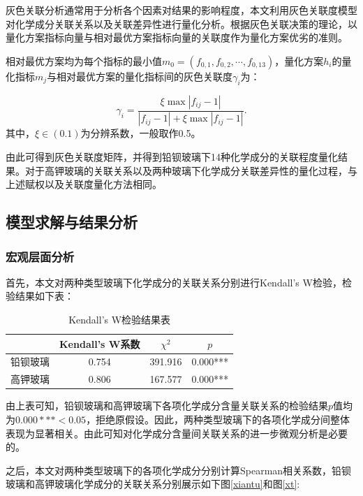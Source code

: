 \documentclass[withoutpreface,bwprint]{cumcmthesis} %
\begin{document}
灰色关联分析通常用于分析各个因素对结果的影响程度，本文利用灰色关联度模型对化学成分关联关系以及关联差异性进行量化分析。根据灰色关联决策的理论，以量化方案指标向量与相对最优方案指标向量的关联度作为量化方案优劣的准则。

相对最优方案均为每个指标的最小值$m_0 = (f_{0,1},f_{0,2},\cdots,f_{0,13})$，量化方案$h_i$的量化指标$m_j$与相对最优方案的量化指标间的灰色关联度$\gamma_i$为：

\begin{equation}
  \gamma _ { i  } = \frac { \xi \operatorname { max }  | f _ { i j } - 1 | } { | f _ { i j } - 1 | + \xi \operatorname { max } | f _ { i j } - 1 | }.
\end{equation}
其中，$\xi \in ( 0.1 )$为分辨系数，一般取作0.5。

由此可得到灰色关联度矩阵，并得到铅钡玻璃下14种化学成分的关联程度量化结果。对于高钾玻璃的关联关系以及两种玻璃下化学成分关联差异性的量化过程，与上述赋权以及关联度量化方法相同。

\subsection{模型求解与结果分析}

\subsubsection{宏观层面分析}

首先，本文对两种类型玻璃下化学成分的关联关系分别进行Kendall's W检验，检验结果如下表：

\begin{table}[H]
  \centering
  \caption{Kendall's W检验结果表}
  \begin{tabular}{cccc}
    \toprule[1.5pt]
    & Kendall's W系数 & $\chi^2$      & $p$       \\ \hline
    铅钡玻璃 & 0.754         & 391.916 & 0.000*** \\
    高钾玻璃 & 0.806         & 167.577 & 0.000*** \\ \bottomrule[1.5pt]
  \end{tabular}
\end{table}

由上表可知，铅钡玻璃和高钾玻璃下各项化学成分含量关联关系的检验结果$p$值均为$0.000*** < 0.05$，拒绝原假设。因此，两种类型玻璃下的各项化学成分间整体表现为显著相关。由此可知对化学成分含量间关联关系的进一步微观分析是必要的。

之后，本文对两种类型玻璃下的各项化学成分分别计算Spearman相关系数，铅钡玻璃和高钾玻璃化学成分的关联关系分别展示如下图\ref{xiantu}和图\ref{xt}:
\end{document}

